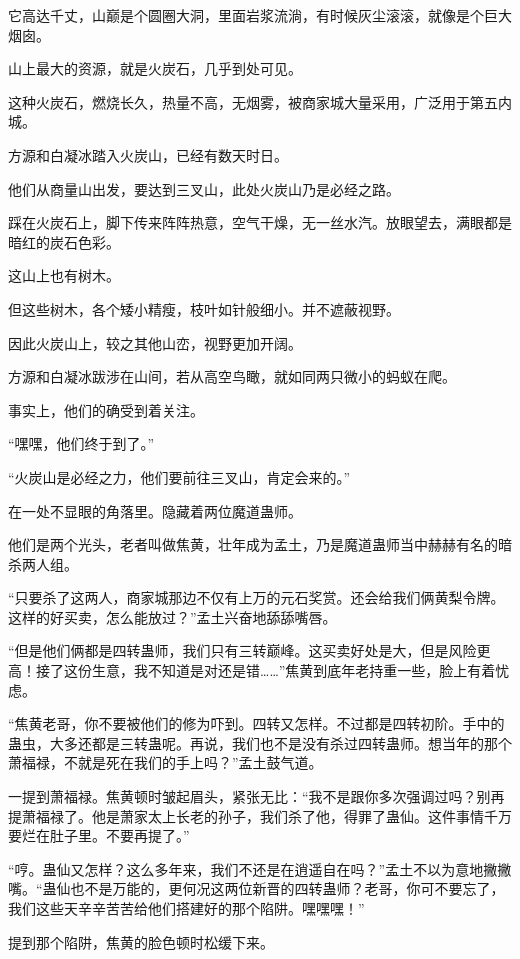 \begin{this_body}
它高达千丈，山巅是个圆圈大洞，里面岩浆流淌，有时候灰尘滚滚，就像是个巨大烟囱。

山上最大的资源，就是火炭石，几乎到处可见。

这种火炭石，燃烧长久，热量不高，无烟雾，被商家城大量采用，广泛用于第五内城。

方源和白凝冰踏入火炭山，已经有数天时日。

他们从商量山出发，要达到三叉山，此处火炭山乃是必经之路。

踩在火炭石上，脚下传来阵阵热意，空气干燥，无一丝水汽。放眼望去，满眼都是暗红的炭石色彩。

这山上也有树木。

但这些树木，各个矮小精瘦，枝叶如针般细小。并不遮蔽视野。

因此火炭山上，较之其他山峦，视野更加开阔。

方源和白凝冰跋涉在山间，若从高空鸟瞰，就如同两只微小的蚂蚁在爬。

事实上，他们的确受到着关注。

“嘿嘿，他们终于到了。”

“火炭山是必经之力，他们要前往三叉山，肯定会来的。”

在一处不显眼的角落里。隐藏着两位魔道蛊师。

他们是两个光头，老者叫做焦黄，壮年成为孟土，乃是魔道蛊师当中赫赫有名的暗杀两人组。

“只要杀了这两人，商家城那边不仅有上万的元石奖赏。还会给我们俩黄梨令牌。这样的好买卖，怎么能放过？”孟土兴奋地舔舔嘴唇。

“但是他们俩都是四转蛊师，我们只有三转巅峰。这买卖好处是大，但是风险更高！接了这份生意，我不知道是对还是错……”焦黄到底年老持重一些，脸上有着忧虑。

“焦黄老哥，你不要被他们的修为吓到。四转又怎样。不过都是四转初阶。手中的蛊虫，大多还都是三转蛊呢。再说，我们也不是没有杀过四转蛊师。想当年的那个萧福禄，不就是死在我们的手上吗？”孟土鼓气道。

一提到萧福禄。焦黄顿时皱起眉头，紧张无比：“我不是跟你多次强调过吗？别再提萧福禄了。他是萧家太上长老的孙子，我们杀了他，得罪了蛊仙。这件事情千万要烂在肚子里。不要再提了。”

“哼。蛊仙又怎样？这么多年来，我们不还是在逍遥自在吗？”孟土不以为意地撇撇嘴。“蛊仙也不是万能的，更何况这两位新晋的四转蛊师？老哥，你可不要忘了，我们这些天辛辛苦苦给他们搭建好的那个陷阱。嘿嘿嘿！”

提到那个陷阱，焦黄的脸色顿时松缓下来。


\end{this_body}
